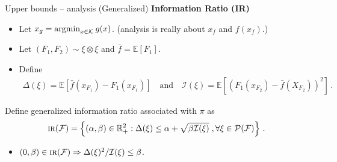 \documentclass{beamer}
\newcommand{\argmin}{\operatornamewithlimits{argmin}}
\newcommand{\E}{\mathbb{E}}
\newcommand{\R}{\mathbb{R}}
\newcommand{\cK}{\mathcal{K}}
\newcommand{\cF}{\mathcal{F}}
\newcommand{\cP}{\mathcal{P}}
\newcommand{\cI}{\mathcal{I}}
\newcommand{\IR}{\operatorname{\textsc{ir}}}
\begin{document}
\begin{frame}{Upper bounds -- analysis}
    (Generalized) \textbf{Information Ratio (IR)}
    \vspace{0.5em}
    \small
    \begin{itemize}
        \item Let $x_g = \argmin_{x\in\cK} g(x)$. (analysis is really about $x_f$ and $f(x_f)$.)
        \item Let $(F_1, F_2) \sim \xi \otimes \xi$ and $\bar{f} = \E[F_1]$.
        \item Define
              \begin{align*}
                  \Delta(\xi) = \E[\bar{f}(x_{F_1}) - F_1(x_{F_1})]
                  \quad \text{and} \quad \cI(\xi) = \E[(F_1(x_{F_2}) - \bar{f}(X_{F_2}))^2]\,.
              \end{align*}
    \end{itemize}
    \begin{tcolorbox}[title=Generalized IR ,colback=green!5!white,colframe=green!50!black]
        Define generalized information ratio associated with $\pi$ as
        \[
            \IR(\cF) = \left\{(\alpha, \beta) \in \R_+^2 : \Delta(\xi) \leq \alpha + \sqrt{\beta \cI(\xi)}  \;,\forall \xi\in \cP(\cF) \right\} \,.
        \]
    \end{tcolorbox}
    \begin{itemize}
        \item $(0,\beta) \in \IR(\cF) \Rightarrow \Delta(\xi)^2/\cI(\xi) \leq \beta$.
    \end{itemize}
\end{frame}

\end{document}
